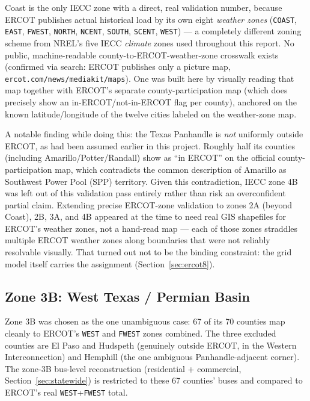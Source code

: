 \documentclass[11pt]{article}
\begin{document}
Coast is the only IECC zone with a direct, real validation number, because ERCOT
publishes actual historical load by its own eight \emph{weather zones} (\texttt{COAST},
\texttt{EAST}, \texttt{FWEST}, \texttt{NORTH}, \texttt{NCENT}, \texttt{SOUTH},
\texttt{SCENT}, \texttt{WEST}) --- a completely different zoning scheme from NREL's five
IECC \emph{climate} zones used throughout this report. No public, machine-readable
county-to-ERCOT-weather-zone crosswalk exists (confirmed via search: ERCOT publishes
only a picture map, \texttt{ercot.com/news/mediakit/maps}). One was built here by
visually reading that map together with ERCOT's separate county-participation map
(which does precisely show an in-ERCOT/not-in-ERCOT flag per county), anchored on the
known latitude/longitude of the twelve cities labeled on the weather-zone map.

A notable finding while doing this: the Texas Panhandle is \emph{not} uniformly
outside ERCOT, as had been assumed earlier in this project. Roughly half its counties
(including Amarillo/Potter/Randall) show as ``in ERCOT'' on the official
county-participation map, which contradicts the common description of Amarillo as
Southwest Power Pool (SPP) territory. Given this contradiction, IECC zone 4B was left
out of this validation pass entirely rather than risk an overconfident partial claim.
Extending precise ERCOT-zone validation to zones 2A (beyond Coast), 2B, 3A, and 4B
appeared at the time to need real GIS shapefiles for ERCOT's weather zones, not a
hand-read map --- each of those zones straddles multiple ERCOT weather zones along
boundaries that were not reliably resolvable visually. That turned out not to be the
binding constraint: the grid model itself carries the assignment
(Section~\ref{sec:ercot8}).

\subsection{Zone 3B: West Texas / Permian Basin}

Zone 3B was chosen as the one unambiguous case: 67 of its 70 counties map cleanly to
ERCOT's \texttt{WEST} and \texttt{FWEST} zones combined. The three excluded counties
are El Paso and Hudspeth (genuinely outside ERCOT, in the Western Interconnection) and
Hemphill (the one ambiguous Panhandle-adjacent corner). The zone-3B bus-level
reconstruction (residential + commercial, Section~\ref{sec:statewide}) is restricted
to these 67 counties' buses and compared to ERCOT's real \texttt{WEST}+\texttt{FWEST}
total.
\end{document}
